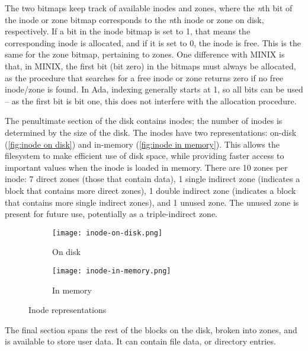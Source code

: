 The two bitmaps keep track of available inodes and zones, where the \textit{n}th bit of the inode or zone bitmap corresponds to the \textit{n}th inode or zone on disk, respectively.
If a bit in the inode bitmap is set to 1, that means the corresponding inode is allocated, and if it is set to 0, the inode is free.
This is the same for the zone bitmap, pertaining to zones.
One difference with MINIX is that, in MINIX, the first bit (bit zero) in the bitmaps must always be allocated, as the procedure that searches for a free inode or zone returns zero if no free inode/zone is found.
In Ada, indexing generally starts at 1, so all bits can be used -- as the first bit is bit one, this does not interfere with the allocation procedure.

The penultimate section of the disk contains inodes; the number of inodes is determined by the size of the disk.
The inodes have two representations: on-disk (\autoref{fig:inode on disk}) and in-memory (\autoref{fig:inode in memory}).
This allows the filesystem to make efficient use of disk space, while providing faster access to important values when the inode is loaded in memory.
There are 10 zones per inode: 7 direct zones (those that contain data), 1 single indirect zone (indicates a block that contains more direct zones), 1 double indirect zone (indicates a block that contains more single indirect zones), and 1 unused zone.
The unused zone is present for future use, potentially as a triple-indirect zone.

\begin{figure}[tb]
     \centering
     \begin{subfigure}[b]{0.45\textwidth}
         \centering
         \texttt{[image: inode-on-disk.png]}
         \caption{On disk}
         \label{fig:inode on disk}
     \end{subfigure}
     \begin{subfigure}[b]{0.45\textwidth}
         \centering
         \texttt{[image: inode-in-memory.png]}
         \caption{In memory}
         \label{fig:inode in memory}
     \end{subfigure}
     \caption{Inode representations}
     \label{fig:inode representations}
\end{figure}


The final section spans the rest of the blocks on the disk, broken into zones, and is available to store user data.
It can contain file data, or directory entries.

